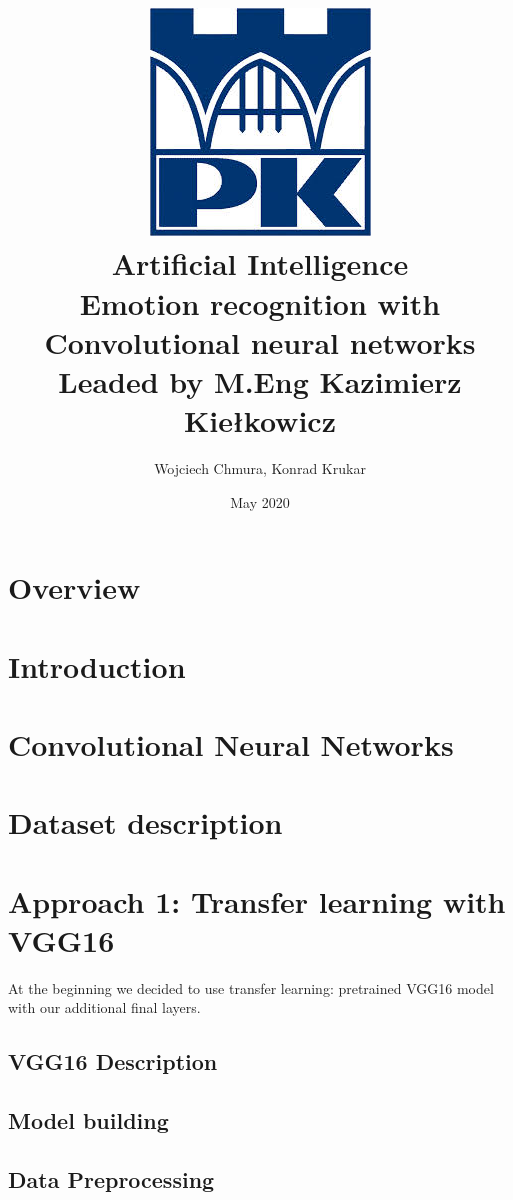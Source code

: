 \documentclass{article}
\title{
    {\includegraphics{./images/logo_pk.jpg}}\\
    {Artificial Intelligence}\\
    {\large Emotion recognition with Convolutional neural networks}\\
     \small Leaded by M.Eng Kazimierz Kiełkowicz
    }
\author{Wojciech Chmura, Konrad Krukar}
\date{May 2020}
\begin{document}
    \maketitle
    \newpage
    \tableofcontents
    \newpage
    
    \section{Overview}
    
    
    \section{Introduction}
        
    
    \newpage
    \section{Convolutional Neural Networks}
        
    
    \newpage
    \section{Dataset description}
    
    
    \newpage
    \section{Approach 1: Transfer learning with VGG16}
    At the beginning we decided to use transfer learning: pretrained VGG16 model with our additional final layers.
 
    	\subsection{VGG16 Description}
    	
    	
    	\newpage
    	\subsection{Model building}
    	
    
    	\newpage
    	\subsection{Data Preprocessing}
    	
    	
\end{document}
